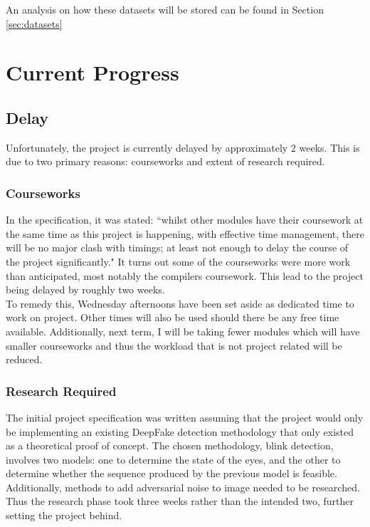 \documentclass{article}
\begin{document}
An analysis on how these datasets will be stored can be found in Section \ref{sec:datasets}

\section{Current Progress}

\subsection{Delay}

Unfortunately, the project is currently delayed by approximately 2 weeks. This is due to two primary reasons: courseworks and extent of research required.

\subsubsection{Courseworks}

In the specification, it was stated: ``whilst other modules have their coursework at the same time as this project is happening, with effective time management, there will be no major clash with timings; at least not enough to delay the course of the project significantly." It turns out some of the courseworks were more work than anticipated, most notably the compilers coursework. This lead to the project being delayed by roughly two weeks.\\

To remedy this, Wednesday afternoons have been set aside as dedicated time to work on project. Other times will also be used should there be any free time available. Additionally, next term, I will be taking fewer modules which will have smaller courseworks and thus the workload that is not project related will be reduced.

\subsubsection{Research Required}

The initial project specification was written assuming that the project would only be implementing an existing DeepFake detection methodology that only existed as a theoretical proof of concept. The chosen methodology, blink detection, involves two models: one to determine the state of the eyes, and the other to determine whether the sequence produced by the previous model is feasible. Additionally, methods to add adversarial noise to image needed to be researched. Thus the research phase took three weeks rather than the intended two, further setting the project behind.
\end{document}
